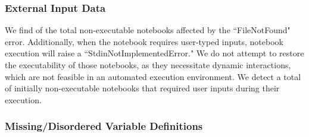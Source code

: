     \subsubsection{External Input Data}
        We find \percentFileNotFoundInNonExecutable of the total non-executable notebooks affected by the ``FileNotFound" error. Additionally, when the notebook requires user-typed inputs, notebook execution will raise a ``StdinNotImplementedError." We do not attempt to restore the executability of those notebooks, as they necessitate dynamic interactions, which are not feasible in an automated execution environment. We detect a total of \percentUserInputsInNonExecutable initially non-executable notebooks that required user inputs during their execution. 
        

        
    \subsubsection{Missing/Disordered Variable Definitions}

        

